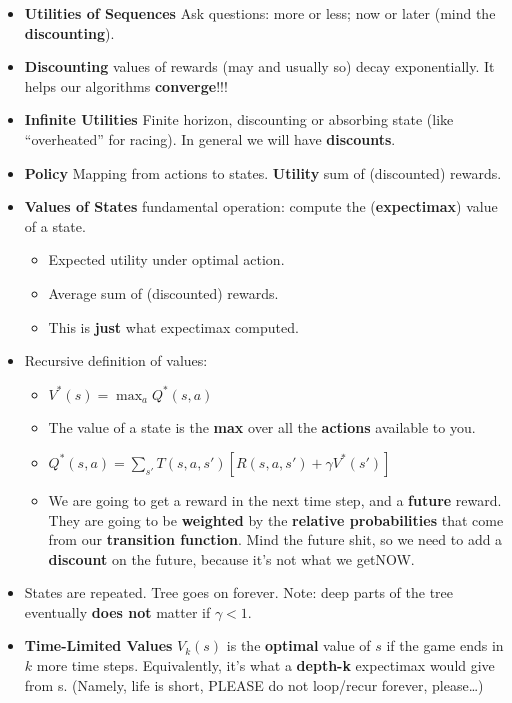 \documentclass[twocolumn]{article}
\begin{document}
\begin{itemize}
\item \textbf{Utilities of Sequences} Ask questions: more or less; now
  or later (mind the \textbf{discounting}). 
\item \textbf{Discounting} values of rewards (may and usually so)
  decay exponentially. It helps our algorithms \textbf{converge}!!!
\item \textbf{Infinite Utilities} Finite horizon, discounting or
  absorbing state (like ``overheated'' for racing). In general we will
  have \textbf{discounts}.
\item \textbf{Policy} Mapping from actions to states. \textbf{Utility}
  sum of (discounted) rewards.
\item \textbf{Values of States} fundamental operation: compute the
  (\textbf{expectimax}) value of a state. 
  \begin{itemize}
  \item Expected utility under optimal action.
  \item Average sum of (discounted) rewards.
  \item This is \textbf{just} what expectimax computed.
  \end{itemize}
\item Recursive definition of values:
  \begin{itemize}
  \item $V^{*}(s)={\displaystyle\max_{a}}Q^{*}(s,a)$
  \item The value of a state is the \textbf{max} over all the
    \textbf{actions} available to you.
  \item $Q^{*}(s,a)=\sum_{s'}T(s,a,s')[R(s,a,s')+\gamma V^{*}(s')]$
  \item We are going to get a reward in the next time step, and a
    \textbf{future} reward. They are going to be \textbf{weighted} by
    the \textbf{relative probabilities} that come from our
    \textbf{transition function}. Mind the future shit, so we need to
    add a \textbf{discount} on the future, because it's not what we
    get\@ NOW.
  \end{itemize}
\item States are repeated. Tree goes on forever. Note: deep parts of
  the tree eventually \textbf{does not} matter if $\gamma < 1$.
\item \textbf{Time-Limited Values} $V_{k}(s)$ is the \textbf{optimal}
  value of $s$ if the game ends in $k$ more time steps. Equivalently,
  it's what a \textbf{depth-k} expectimax would give from s. (Namely,
  life is short, PLEASE do not loop/recur forever, please\ldots)

\end{itemize}
\end{document}
